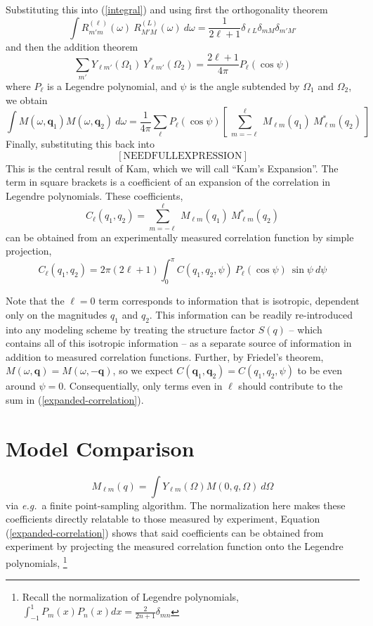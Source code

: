 \documentclass[aps,prl,preprint,groupedaddress]{revtex4-1}
\def\*#1{\mathbf{#1}}
\begin{document}
Substituting this into (\ref{integral}) and using first the orthogonality theorem
\[
\int R_{m' m}^{(\ell)} (\omega) \> R_{M' M}^{(L)} (\omega) \> d\omega = \frac{1}{2 \ell + 1} \delta_{\ell L} \delta_{m M} \delta_{m' M'}
\]
and then the addition theorem
\[
\sum_{m'} Y_{\ell m'} (\Omega_1) \> Y_{\ell m'}^* (\Omega_2) = \frac{2 \ell + 1}{ 4 \pi} P_\ell (\cos \psi)
\]
where $P_\ell$ is a Legendre polynomial, and $\psi$ is the angle subtended by $\Omega_1$ and $\Omega_2$, we obtain
\begin{equation}\label{expanded}
\int M( \omega, \*{q}_1 ) M( \omega, \*{q}_2 ) \> d \omega = \frac{1}{4 \pi} \sum_{\ell} P_\ell (\cos \psi) \left[ \> \sum_{m = -\ell}^{\ell}  \> M_{\ell m} (q_1) \> M_{\ell m}^* (q_2) \> \right]
\end{equation}
Finally, substituting this back into
\begin{equation}\label{kamtheorem}
\mathrm{ [NEED FULL EXPRESSION]}
\end{equation}
This is the central result of Kam, which we will call ``Kam's Expansion''. The term in square brackets is a coefficient of an expansion of the correlation in Legendre polynomials. These coefficients,
\begin{equation}\label{Cl}
C_\ell (q_1, q_2) = \sum_{m = -\ell}^{\ell}  \> M_{\ell m} (q_1) \> M_{\ell m}^* (q_2)
\end{equation}
can be obtained from an experimentally measured correlation function by simple projection,
\[
C_\ell (q_1, q_2) = 2 \pi (2 \ell + 1 ) \int_{0}^{\pi} C( q_1, q_2, \psi ) \> P_\ell (\cos \psi ) \> \sin \psi \> d \psi
\]

Note that the $\ell = 0$ term corresponds to information that is isotropic, dependent only on the magnitudes $q_1$ and $q_2$. This information can be readily re-introduced into any modeling scheme by treating the structure factor $S(q)$ -- which contains all of this isotropic information -- as a separate source of information in addition to measured correlation functions. Further, by Friedel's theorem, $M(\omega, \*q) = M(\omega, - \*q)$, so we expect $C( \*q_1, \*q_2 ) = C( q_1, q_2, \psi )$ to be even around $\psi = 0$. Consequentially, only terms even in $\ell$ should contribute to the sum in (\ref{expanded-correlation}).


\section*{Model Comparison}


\begin{equation}\label{M}
M_{\ell m} (q) =  \int Y_{\ell m} (\Omega) M( 0, q, \Omega ) \> d \Omega
\end{equation}
via \textit{e.g.}~a finite point-sampling algorithm. The normalization here makes these coefficients directly relatable to those measured by experiment, 
Equation (\ref{expanded-correlation}) shows that said coefficients can be obtained from experiment by projecting the measured correlation function onto the Legendre polynomials, \footnote{Recall the normalization of Legendre polynomials, $\int_{-1}^{1} P_m (x) P_n(x) dx = \frac{2}{2n + 1} \delta_{mn}$}
\end{document}
